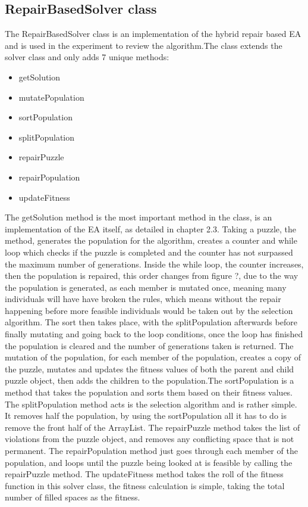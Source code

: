 \documentclass[a4paper,11pt]{article}
\begin{document}
\subsection{RepairBasedSolver class}

The RepairBasedSolver class is an implementation of the hybrid repair based EA and is used in the experiment to review the algorithm.\newline\newline The class extends the solver class and only adds 7 unique methods:
\begin{itemize}
	\item getSolution
	\item mutatePopulation
	\item sortPopulation
	\item splitPopulation
	\item repairPuzzle
	\item repairPopulation
	\item updateFitness
\end{itemize}
The getSolution method is the most important method in the class, is an implementation of the EA itself, as detailed in chapter 2.3. Taking a puzzle, the method, generates the population for the algorithm, creates a counter and while loop which checks if the puzzle is completed and the counter has not surpassed the maximum number of generations. Inside the while loop, the counter increases, then the population is repaired, this order changes from figure ?, due to the way the population is generated, as each member is mutated once, meaning many individuals will have have broken the rules, which means without the repair happening before more feasible individuals would be taken out by the selection algorithm. The sort then takes place, with the splitPopulation afterwards before finally mutating and going back to the loop conditions, once the loop has finished the population is cleared and the number of generations taken is returned. \newline\newline The mutation of the population, for each member of the population, creates a copy of the puzzle, mutates and updates the fitness values of both the parent and child puzzle object, then adds the children to the population.\newline\newline The sortPopulation is a method that takes the population and sorts them based on their fitness values. The splitPopulation method acts is the selection algorithm and is rather simple. It removes half the population, by using the sortPopulation all it has to do is remove the front half of the ArrayList. \newline\newline The repairPuzzle method takes the list of violations from the puzzle object, and removes any conflicting space that is not permanent. The repairPopulation method just goes through each member of the population, and loops until the puzzle being looked at is feasible by calling the repairPuzzle method. The updateFitness method takes the roll of the fitness function in this solver class, the fitness calculation is simple, taking the total number of filled spaces as the fitness.
\end{document}
